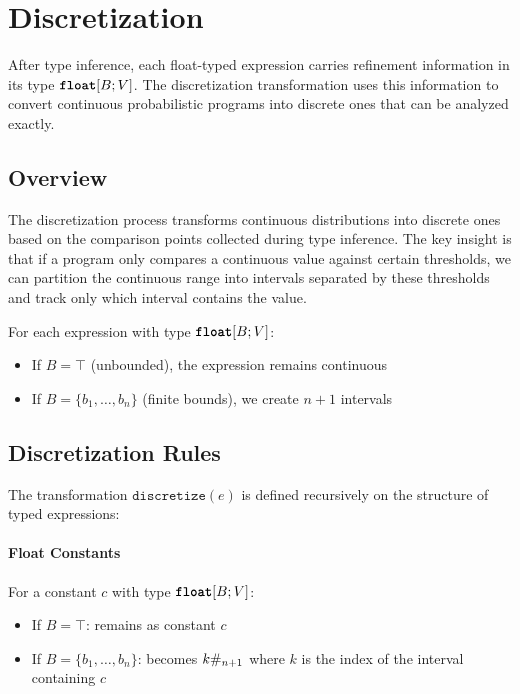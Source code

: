 \section{Discretization}\label{sec:discretization}

After type inference, each float-typed expression carries refinement information in its type $\text{\ttfamily\bfseries float}[B; V]$. The discretization transformation uses this information to convert continuous probabilistic programs into discrete ones that can be analyzed exactly.

\subsection{Overview}

The discretization process transforms continuous distributions into discrete ones based on the comparison points collected during type inference. The key insight is that if a program only compares a continuous value against certain thresholds, we can partition the continuous range into intervals separated by these thresholds and track only which interval contains the value.

For each expression with type $\text{\ttfamily\bfseries float}[B; V]$:
\begin{itemize}
    \item If $B = \top$ (unbounded), the expression remains continuous
    \item If $B = \{b_1, \ldots, b_n\}$ (finite bounds), we create $n+1$ intervals
\end{itemize}

\subsection{Discretization Rules}

The transformation $\texttt{discretize}(e)$ is defined recursively on the structure of typed expressions:

\paragraph{Float Constants} For a constant $c$ with type $\text{\ttfamily\bfseries float}[B; V]$:
\begin{itemize}
    \item If $B = \top$: remains as constant $c$
    \item If $B = \{b_1, \ldots, b_n\}$: becomes $k\#_{n+1}$ where $k$ is the index of the interval containing $c$
\end{itemize}

